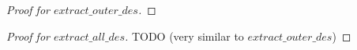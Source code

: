 \documentclass[11pt]{article} %
\begin{document}
\begin{proof}[Proof for $extract\_outer\_des$]
%
%
%

\end{proof}

\begin{proof}[Proof for $extract\_all\_des$]

TODO (very similar to $extract\_outer\_des$)

\end{proof}
\end{document}
